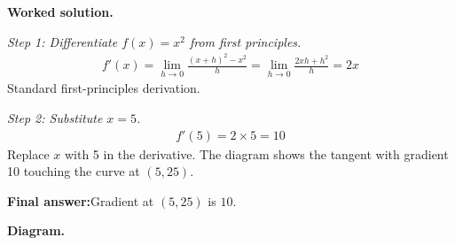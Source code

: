 \documentclass[11pt]{article}
\begin{document}
\textbf{Worked solution.}

\textit{Step 1: Differentiate \( f(x) = x^2 \) from first principles.}
\[\begin{gathered}
f'(x) = \lim_{h \to 0} \frac{(x+h)^2 - x^2}{h} = \lim_{h \to 0} \frac{2xh + h^2}{h} = 2x
\end{gathered}\]
Standard first-principles derivation.

\textit{Step 2: Substitute \( x = 5 \).}
\[\begin{gathered}
f'(5) = 2 \times 5 = 10
\end{gathered}\]
Replace \( x \) with 5 in the derivative. The diagram shows the tangent with gradient 10 touching the curve at \( (5, 25) \).

\begin{answerbox}
\textbf{Final answer:}\quad Gradient at \(\displaystyle  (5, 25) \) is \(\displaystyle  10 \).
\end{answerbox}
\textbf{Diagram.}
\end{document}
